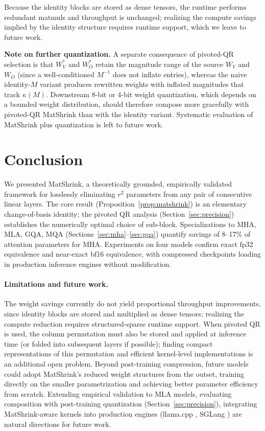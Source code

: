 \documentclass{article}
\begin{document}
Because the identity blocks are stored as dense tensors, the runtime performs redundant matmuls and throughput is unchanged; realizing the compute savings implied by the identity structure requires runtime support, which we leave to future work.

\textbf{Note on further quantization.} A separate consequence of pivoted-QR selection is that $W_V^\ast$ and $W_O^\ast$ retain the magnitude range of the source $W_V$ and $W_O$ (since a well-conditioned $M^{-1}$ does not inflate entries), whereas the naive identity-$M$ variant produces rewritten weights with inflated magnitudes that track $\kappa(M)$. Downstream 8-bit or 4-bit weight quantization, which depends on a bounded weight distribution, should therefore compose more gracefully with pivoted-QR MatShrink than with the identity variant. Systematic evaluation of MatShrink plus quantization is left to future work.

\section{Conclusion}
We presented MatShrink, a theoretically grounded, empirically validated framework for losslessly eliminating $r^2$ parameters from any pair of consecutive linear layers. The core result (Proposition~\ref{prop:matshrink}) is an elementary change-of-basis identity; the pivoted QR analysis (Section~\ref{sec:precision}) establishes the numerically optimal choice of sub-block. Specializations to MHA, MLA, GQA, MQA (Sections~\ref{sec:mha}--\ref{sec:gqa}) quantify savings of 8--17\% of attention parameters for MHA.
Experiments on four models confirm exact fp32 equivalence and near-exact bf16 equivalence, with compressed checkpoints loading in production inference engines without modification.

\paragraph{Limitations and future work.}
The weight savings currently do not yield proportional throughput improvements, since identity blocks are stored and multiplied as dense tensors; realizing the compute reduction requires structured-sparse runtime support.
When pivoted QR is used, the column permutation must also be stored and applied at inference time (or folded into subsequent layers if possible); finding compact representations of this permutation and efficient kernel-level implementations is an additional open problem.
Beyond post-training compression, future models could adopt MatShrink's reduced weight structures from the outset, training directly on the smaller parametrization and achieving better parameter efficiency from scratch.
Extending empirical validation to MLA models, evaluating composition with post-training quantization (Section~\ref{sec:precision}), integrating MatShrink-aware kernels into production engines (llama.cpp \citep{llama-cpp}, SGLang \citep{sglang}) are natural directions for future work.





\newpage

\end{document}
